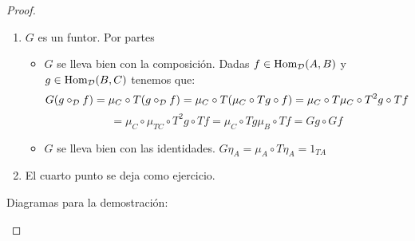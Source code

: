 \begin{proof}
\begin{enumerate}
  \item $G$ es un funtor. Por partes
    \begin{itemize}
    \item $G$ se lleva bien con la composición. Dadas $f \in \operatorname{Hom}_{\mathcal{D}}(A, B)$
      y $g \in \operatorname{Hom}_{\mathcal{D}}(B, C)$ tenemos que:
      $$G(g \circ_{\mathcal{D}} f) = \mu_C \circ T(g \circ_{\mathcal{D}} f)
      = \mu_C \circ T(\mu_C \circ Tg \circ f)
      = \mu_C \circ T\mu_C \circ T^2g \circ Tf$$
      $$= \mu_C \circ \mu_{TC} \circ T^2g \circ Tf
      = \mu_C \circ Tg \mu_B \circ Tf
      = Gg \circ Gf$$
    \item $G$ se lleva bien con las identidades.
      $G\eta_A = \mu_A \circ T\eta_A = 1_{TA}$
    \end{itemize}
  \item El cuarto punto se deja como ejercicio.

  \end{enumerate}


  Diagramas para la demostración:
  \begin{center}
  \end{center}
  \begin{center}
  \end{center}
  \begin{center}
  \end{center}

  \begin{center}
  \end{center}
\end{proof}
